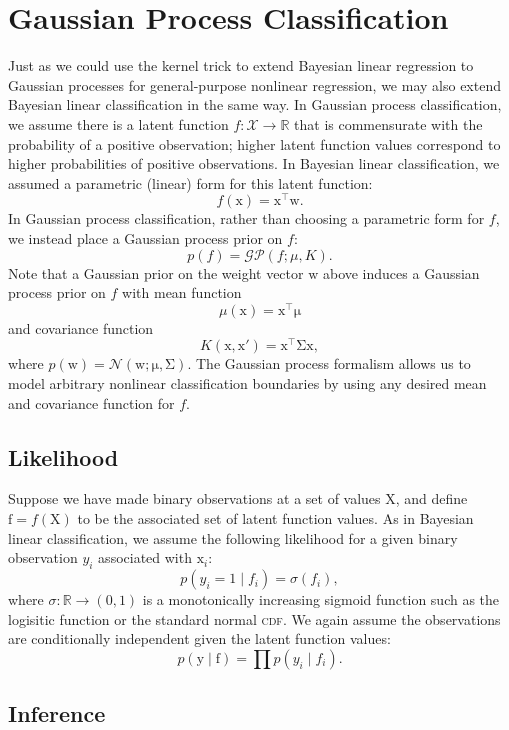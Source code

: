 \documentclass{article}
\newcommand{\acro}[1]{\textsc{\MakeLowercase{#1}}}
\newcommand{\given}{\mid}
\newcommand{\mc}[1]{\mathcal{#1}}
\newcommand{\trans}{^\top}
\newcommand{\mat}[1]{\bm{\mathrm{#1}}}
\renewcommand{\vec}[1]{\bm{\mathrm{#1}}}
\newcommand{\R}{\mathbb{R}}
\begin{document}
\section*{Gaussian Process Classification}

Just as we could use the kernel trick to extend Bayesian linear
regression to Gaussian processes for general-purpose nonlinear
regression, we may also extend Bayesian linear classification in the
same way.  In Gaussian process classification, we assume there is a
latent function $f\colon \mc{X} \to \R$ that is commensurate with the
probability of a positive observation; higher latent function values
correspond to higher probabilities of positive observations.  In
Bayesian linear classification, we assumed a parametric (linear) form
for this latent function:
\[
  f(\vec{x}) = \vec{x}\trans \vec{w}.
\]
In Gaussian process classification, rather than choosing a parametric
form for $f$, we instead place a Gaussian process prior on $f$:
\[
  p(f) = \mc{GP}(f; \mu, K).
\]
Note that a Gaussian prior on the weight vector $\vec{w}$ above
induces a Gaussian process prior on $f$ with mean function
\[
  \mu(\vec{x}) = \vec{x}\trans \vec{\mu}
\]
and covariance function
\[
  K(\vec{x}, \vec{x}') = \vec{x}\trans \mat{\Sigma} \vec{x},
\]
where $p(\vec{w}) = \mc{N}(\vec{w}; \vec{\mu}, \mat{\Sigma})$. The
Gaussian process formalism allows us to model arbitrary nonlinear
classification boundaries by using any desired mean and covariance
function for $f$.

\subsection*{Likelihood}

Suppose we have made binary observations at a set of values $\mat{X}$,
and define $\vec{f} = f(\mat{X})$ to be the associated set of latent
function values.  As in Bayesian linear classification, we assume
the following likelihood for a given binary observation $y_i$
associated with $\vec{x}_i$:
\[
  p(y_i = 1 \given f_i)
  =
  \sigma(f_i),
\]
where $\sigma\colon \R \to (0, 1)$ is a monotonically increasing
sigmoid function such as the logisitic function or the standard normal
\acro{CDF}.  We again assume the observations are conditionally
independent given the latent function values:
\[
  p(\vec{y} \given \vec{f})
  =
  \prod p(y_i \given f_i).
\]

\subsection*{Inference}
\end{document}
